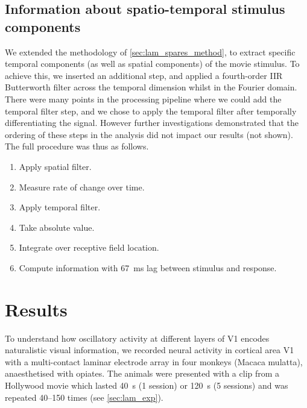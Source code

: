 \subsection{Information about spatio-temporal stimulus components}
\label{sec:lam_tmf_method}

We extended the methodology of \autoref{sec:lam_spares_method}, to extract specific temporal components (as well as spatial components) of the movie stimulus.
To achieve this, we inserted an additional step, and applied a fourth-order \ac{IIR} Butterworth filter across the temporal dimension whilst in the Fourier domain.
There were many points in the processing pipeline where we could add the temporal filter step, and we chose to apply the temporal filter after temporally differentiating the signal.
However further investigations demonstrated that the ordering of these steps in the analysis did not impact our results (not shown).
The full procedure was thus as follows.
\begin{enumerate}
\item Apply spatial filter.
\item Measure rate of change over time.
\item Apply temporal filter.
\item Take absolute value.
\item Integrate over receptive field location.
\item Compute information with \SI{67}{\milli\second} lag between stimulus and response.
\end{enumerate}


\section{Results}

To understand how oscillatory activity at different layers of \acf{V1} encodes naturalistic visual information, we recorded neural activity in cortical area \acs{V1} with a multi-contact laminar electrode array in four monkeys (Macaca mulatta), anaesthetised with opiates.
The animals were presented with a clip from a Hollywood movie which lasted \SI{40}{\second} (\num{1} session) or \SI{120}{\second} (\num{5} sessions) and was repeated \numrange{40}{150} times (see \autoref{sec:lam_exp}).

